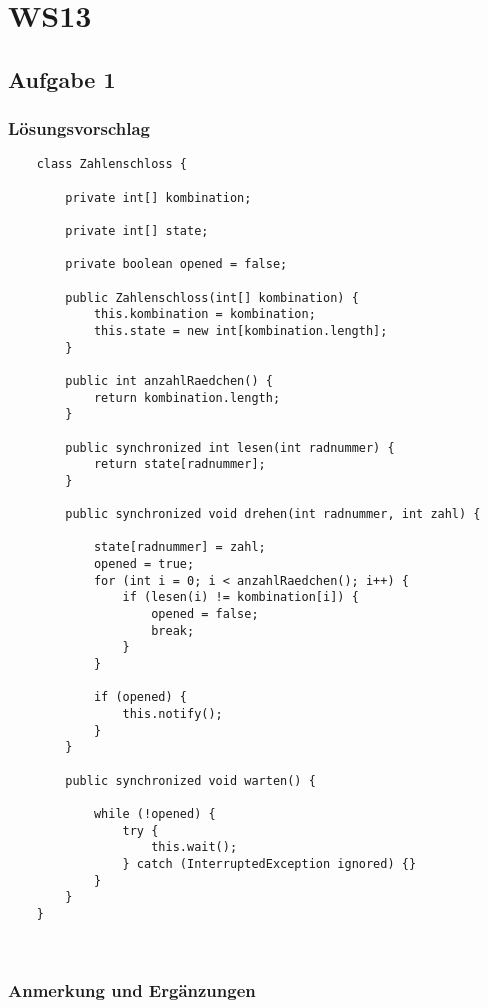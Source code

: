 \usepackage{lstmisc}\chapter{WS13}\label{ch:klausurws13}

\section{Aufgabe 1}
\subsection{Lösungsvorschlag}


\begin{verbatim}
    class Zahlenschloss {

        private int[] kombination;

        private int[] state;

        private boolean opened = false;

        public Zahlenschloss(int[] kombination) {
            this.kombination = kombination;
            this.state = new int[kombination.length];
        }

        public int anzahlRaedchen() {
            return kombination.length;
        }

        public synchronized int lesen(int radnummer) {
            return state[radnummer];
        }

        public synchronized void drehen(int radnummer, int zahl) {

            state[radnummer] = zahl;
            opened = true;
            for (int i = 0; i < anzahlRaedchen(); i++) {
                if (lesen(i) != kombination[i]) {
                    opened = false;
                    break;
                }
            }

            if (opened) {
                this.notify();
            }
        }

        public synchronized void warten() {

            while (!opened) {
                try {
                    this.wait();
                } catch (InterruptedException ignored) {}
            }
        }
    }
\end{verbatim}\\


\subsection{Anmerkung und Ergänzungen}

